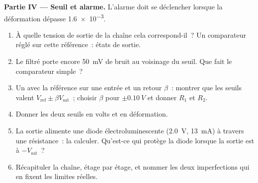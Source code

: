 \begin{problem}
\medskip
\noindent\textbf{Partie IV --- Seuil et alarme.}
L'alarme doit se déclencher lorsque la déformation dépasse \num{1.6e-3}.
\begin{enumerate}[resume]
  \item À quelle tension de sortie de la chaîne cela correspond-il~? Un
        comparateur réglé sur cette référence~: états de sortie.
  \item Le  filtré porte encore \qty{50}{mV} de bruit au voisinage
        du seuil. Que fait le comparateur simple~?
  \item Un  avec la référence sur une entrée et un
        retour $\beta$~: montrer que les seuils valent $V_{\mathrm{ref}} \pm
        \beta V_{\mathrm{sat}}$~; choisir $\beta$ pour $\pm\qty{0.10}{V}$
        et donner $R_1$ et $R_2$.
  \item Donner les deux seuils en volts et en déformation.
  \item La sortie alimente une diode électroluminescente (\qty{2.0}{V},
        \qty{13}{mA}) à travers une résistance~: la calculer. Qu'est-ce
        qui protège la diode lorsque la sortie est à $-V_{\mathrm{sat}}$~?
  \item Récapituler la chaîne, étage par étage, et nommer les deux
        imperfections qui en fixent les limites réelles.
\end{enumerate}
\end{problem}
